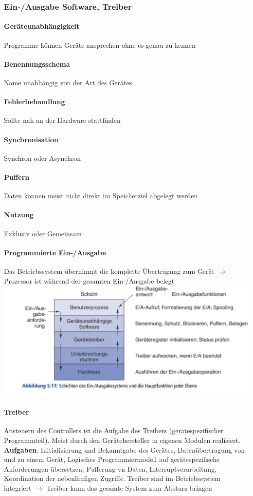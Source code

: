\documentclass[11pt,a4paper,landscape]{article}
\begin{document}
\begin{multicols*}{3}
	\subsubsection{Ein-/Ausgabe Software, Treiber}
	\paragraph{Geräteunabhängigkeit} Programme können Geräte ansprechen ohne es genau zu kennen
	\paragraph{Benennungsschema} Name unabhängig von der Art des Gerätes
	\paragraph{Fehlerbehandlung} Sollte nah an der Hardware stattfinden
	\paragraph{Synchronisation} Synchron oder Asynchron
	\paragraph{Puffern} Daten können meist nicht direkt im Speicherziel abgelegt werden
	\paragraph{Nutzung} Exklusiv oder Gemeinsam
	\paragraph{Programmierte Ein-/Ausgabe} Das Betriebssystem übernimmt die komplette Übertragung zum Gerät $\rightarrow$ Prozessor ist während der gesamten Ein-/Ausgabe belegt\\
	\includegraphics[width=0.95\columnwidth]{einausgabe}
	\paragraph{Treiber} Ansteuern des Controllers ist die Aufgabe des Treibers (gerätespezifischer Programmteil). Meist durch den Gerätehersteller in eigenen Modulen realisiert. \textbf{Aufgaben}: Initialisierung und Bekanntgabe des Gerätes, Datenübertragung von und zu einem Gerät, Logisches Programmiermodell auf gerätespezifische Anforderungen übersetzen, Pufferung vn Daten, Interruptverarbeitung, Koordination der nebenläufigen Zugriffe. Treiber sind im Betriebssystem integriert $\rightarrow$ Treiber kann das gesamte System zum Absturz bringen

\end{multicols*}
\end{document}
